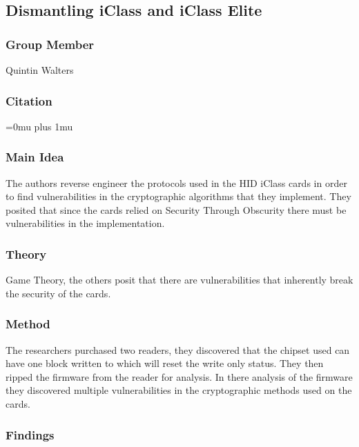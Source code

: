 \noindent
\subsection{Dismantling iClass and iClass Elite}

\subsubsection{Group Member}

\noindent
Quintin Walters

\noindent
\subsubsection{Citation}

\Urlmuskip=0mu plus 1mu\relax

\subsubsection{Main Idea}

\noindent
The authors reverse engineer the protocols used in the HID iClass cards in order to find vulnerabilities in the cryptographic algorithms that they implement.  They posited that since the cards relied on Security Through Obscurity there must be vulnerabilities in the implementation.

\subsubsection{Theory}

\noindent
Game Theory, the others posit that there are vulnerabilities that inherently break the security of the cards.

\subsubsection{Method}

\noindent
The researchers purchased two readers, they discovered that the chipset used can have one block written to which will reset the write only status. They then ripped the firmware from the reader for analysis.  In there analysis of the firmware they discovered multiple vulnerabilities in the cryptographic methods used on the cards.

\subsubsection{Findings}

